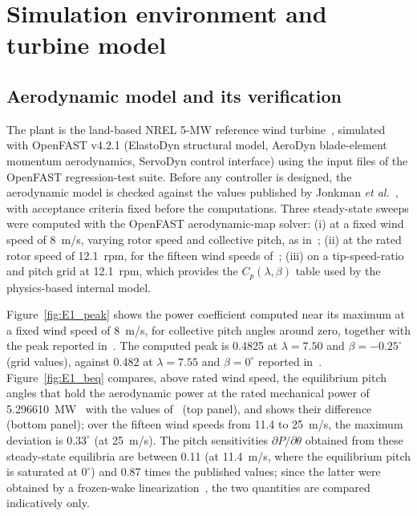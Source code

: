 \section{Simulation environment and turbine model}
\label{sec:methods}

\subsection{Aerodynamic model and its verification}
\label{subsec:aero_verification}
{\color{revQ1}
The plant is the land-based NREL 5-MW reference wind turbine~\cite{jonkman2009}, simulated with OpenFAST v4.2.1 (ElastoDyn structural model, AeroDyn blade-element momentum aerodynamics, ServoDyn control interface) using the input files of the OpenFAST regression-test suite. Before any controller is designed, the aerodynamic model is checked against the values published by Jonkman \emph{et al.}~\cite{jonkman2009}, with acceptance criteria fixed before the computations. Three steady-state sweeps were computed with the OpenFAST aerodynamic-map solver: (i) at a fixed wind speed of 8~m/s, varying rotor speed and collective pitch, as in~\cite{jonkman2009}; (ii) at the rated rotor speed of 12.1~rpm, for the fifteen wind speeds of~\cite[Table~7-1]{jonkman2009}; (iii) on a tip-speed-ratio and pitch grid at 12.1~rpm, which provides the $C_p(\lambda,\beta)$ table used by the physics-based internal model.

Figure~\ref{fig:E1_peak} shows the power coefficient computed near its maximum at a fixed wind speed of 8~m/s, for collective pitch angles around zero, together with the peak reported in~\cite{jonkman2009}. The computed peak is 0.4825 at $\lambda = 7.50$ and $\beta = -0.25^\circ$ (grid values), against 0.482 at $\lambda = 7.55$ and $\beta = 0^\circ$ reported in~\cite{jonkman2009}. Figure~\ref{fig:E1_beq} compares, above rated wind speed, the equilibrium pitch angles that hold the aerodynamic power at the rated mechanical power of 5.296610~MW~\cite{jonkman2009} with the values of~\cite[Table~7-1]{jonkman2009} (top panel), and shows their difference (bottom panel); over the fifteen wind speeds from 11.4 to 25~m/s, the maximum deviation is $0.33^\circ$ (at 25~m/s). The pitch sensitivities $\partial P/\partial\theta$ obtained from these steady-state equilibria are between 0.11 (at 11.4~m/s, where the equilibrium pitch is saturated at $0^\circ$) and 0.87 times the published values; since the latter were obtained by a frozen-wake linearization~\cite{jonkman2009}, the two quantities are compared indicatively only.
}

